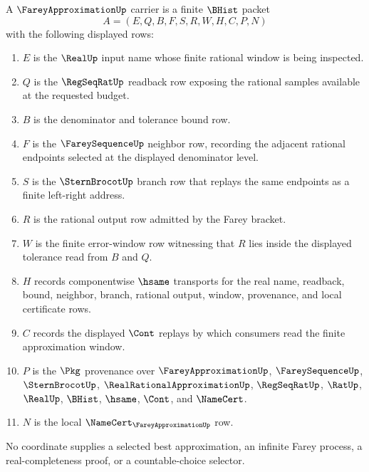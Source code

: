 \begin{definition}
\label{def:farey-approximation-carrier}
A $\FareyApproximationUp$ carrier is a finite $\BHist$ packet
$$
A=(E,Q,B,F,S,R,W,H,C,P,N)
$$
with the following displayed rows:
\begin{enumerate}
\item $E$ is the $\RealUp$ input name whose finite rational window is being inspected.
\item $Q$ is the $\RegSeqRatUp$ readback row exposing the rational samples available at the requested budget.
\item $B$ is the denominator and tolerance bound row.
\item $F$ is the $\FareySequenceUp$ neighbor row, recording the adjacent rational endpoints selected at the displayed denominator level.
\item $S$ is the $\SternBrocotUp$ branch row that replays the same endpoints as a finite left-right address.
\item $R$ is the rational output row admitted by the Farey bracket.
\item $W$ is the finite error-window row witnessing that $R$ lies inside the displayed tolerance read from $B$ and $Q$.
\item $H$ records componentwise $\hsame$ transports for the real name, readback, bound, neighbor, branch, rational output, window, provenance, and local certificate rows.
\item $C$ records the displayed $\Cont$ replays by which consumers read the finite approximation window.
\item $P$ is the $\Pkg$ provenance over $\FareyApproximationUp$, $\FareySequenceUp$, $\SternBrocotUp$, $\RealRationalApproximationUp$, $\RegSeqRatUp$, $\RatUp$, $\RealUp$, $\BHist$, $\hsame$, $\Cont$, and $\NameCert$.
\item $N$ is the local $\NameCert_{\FareyApproximationUp}$ row.
\end{enumerate}
No coordinate supplies a selected best approximation, an infinite Farey process, a real-completeness proof, or a countable-choice selector.
\end{definition}


